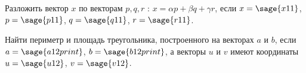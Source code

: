 \begin{question}
	Разложить вектор $ x$ по векторам $ p,  q,  r$ : $ x = \alpha p + \beta q + \gamma r$, если
	${x}=\sage{x11}$, ${p}=\sage{p11}$, ${q}=\sage{q11}$, ${r}=\sage{r11}$.
\end{question}

\begin{question}
	Найти периметр и площадь треугольника, построенного на векторах $ a$ и $ b$, если $ a=\sage{a12print}$, $ b=\sage{b12print}$, а векторы $ u$ и $ v$ имеют координаты $ u=\sage{u12}$, $ v=\sage{v12}$.
\end{question}
